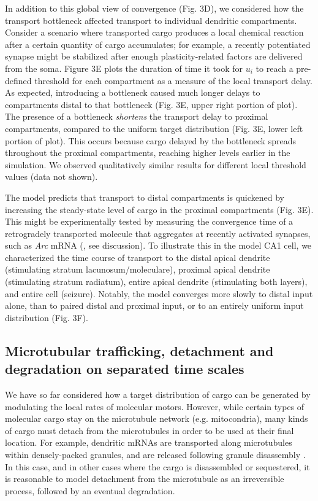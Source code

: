 \documentclass[11pt]{wlpeerj}
\begin{document}
In addition to this global view of convergence (Fig. 3D), we considered how the transport bottleneck affected transport to individual dendritic compartments.
Consider a scenario where transported cargo produces a local chemical reaction after a certain quantity of cargo accumulates; for example, a recently potentiated synapse might be stabilized after enough plasticity-related factors are delivered from the soma.
Figure 3E plots the duration of time it took for $u_i$ to reach a pre-defined threshold for each compartment as a measure of the local transport delay.
As expected, introducing a bottleneck caused much longer delays to compartments distal to that bottleneck (Fig. 3E, upper right portion of plot).
The presence of a bottleneck \textit{shortens} the transport delay to proximal compartments, compared to the uniform target distribution (Fig. 3E, lower left portion of plot).
This occurs because cargo delayed by the bottleneck spreads throughout the proximal compartments, reaching higher levels earlier in the simulation.
We observed qualitatively similar results for different local threshold values (data not shown).

The model predicts that transport to distal compartments is quickened by increasing the steady-state level of cargo in the proximal compartments (Fig. 3E).
This might be experimentally tested by measuring the convergence time of a retrogradely transported molecule that aggregates at recently activated synapses, such as \textit{Arc} mRNA (\citet{Steward_1998}, see discussion).
To illustrate this in the model CA1 cell, we characterized the time course of transport to the distal apical dendrite (stimulating stratum lacunosum/moleculare), proximal apical dendrite (stimulating stratum radiatum), entire apical dendrite (stimulating both layers), and entire cell (seizure). Notably, the model converges more slowly to distal input alone, than to paired distal and proximal input, or to an entirely uniform input distribution (Fig. 3F).

\subsection*{Microtubular trafficking, detachment and degradation on separated time scales}

We have so far considered how a target distribution of cargo can be generated by modulating the local rates of molecular motors.
However, while certain types of molecular cargo stay on the microtubule network (e.g. mitocondria), many kinds of cargo must detach from the microtubules in order to be used at their final location.
For example, dendritic mRNAs are transported along microtubules within densely-packed granules, and are released following granule disassembly \citep{Krichevsky_2001,Buxbaum_2014a}.
In this case, and in other cases where the cargo is disassembled or sequestered, it is reasonable to model detachment from the microtubule as an irreversible process, followed by an eventual degradation.
\end{document}
